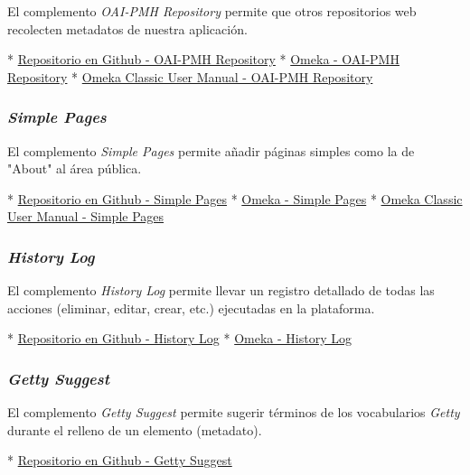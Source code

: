\documentclass[
]{article}
\begin{document}
El complemento \emph{OAI-PMH Repository} permite que otros repositorios
web recolecten metadatos de nuestra aplicación.

* \href{https://github.com/zerocrates/OaiPmhRepository}{Repositorio en
Github - OAI-PMH Repository} *
\href{https://omeka.org/classic/plugins/OaiPmhRepository/}{Omeka -
OAI-PMH Repository} *
\href{https://omeka.org/classic/docs/Plugins/OaiPmhRepository/}{Omeka
Classic User Manual - OAI-PMH Repository}

\hypertarget{simple-pages}{%
\subsubsection{\texorpdfstring{\emph{Simple
Pages}}{Simple Pages}}\label{simple-pages}}

El complemento \emph{Simple Pages} permite añadir páginas simples como
la de "About" al área pública.

* \href{https://github.com/omeka/plugin-SimplePages}{Repositorio en
Github - Simple Pages} *
\href{https://omeka.org/classic/plugins/SimplePages/}{Omeka - Simple
Pages} *
\href{https://omeka.org/classic/docs/Plugins/SimplePages/}{Omeka Classic
User Manual - Simple Pages}

\hypertarget{history-log}{%
\subsubsection{\texorpdfstring{\emph{History
Log}}{History Log}}\label{history-log}}

El complemento \emph{History Log} permite llevar un registro detallado
de todas las acciones (eliminar, editar, crear, etc.) ejecutadas en la
plataforma.

* \href{https://github.com/UCSCLibrary/HistoryLog}{Repositorio en Github
- History Log} *
\href{https://omeka.org/classic/plugins/HistoryLog/}{Omeka - History
Log}

\hypertarget{getty-suggest}{%
\subsubsection{\texorpdfstring{\emph{Getty
Suggest}}{Getty Suggest}}\label{getty-suggest}}

El complemento \emph{Getty Suggest} permite sugerir términos de los
vocabularios \emph{Getty} durante el relleno de un elemento (metadato).

* \href{https://github.com/UCSCLibrary/GettySuggest}{Repositorio en
Github - Getty Suggest}
\end{document}
